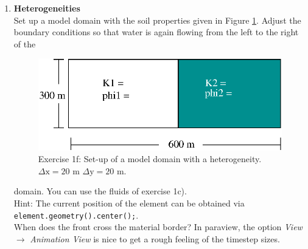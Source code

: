 \begin{enumerate}
\item \textbf{Heterogeneities}  \\
  Set up a model domain with the soil properties given in Figure
  \ref{tutorial-coupled:exercise1_d}. Adjust the boundary conditions
  so that water is again flowing from the left to the right of the
\begin{figure}[h]
\centering
\includegraphics[width=0.5\linewidth,keepaspectratio]{EPS/exercise1_c.eps}
\caption{Exercise 1f: Set-up of a model domain with a heterogeneity. $\Delta \text{x} = 20$ m $\Delta \text{y} = 20$ m.}\label{tutorial-coupled:exercise1_d}
\end{figure}
domain. You can use the fluids of exercise 1c).\\
Hint: The current position of the element can be obtained via \texttt{element.geometry().center();}.\\
When does the front cross the material border? In paraview, the option \textit{View} $\rightarrow$ \textit{Animation View} is nice to get a rough feeling of the timestep sizes.
\end{enumerate}

